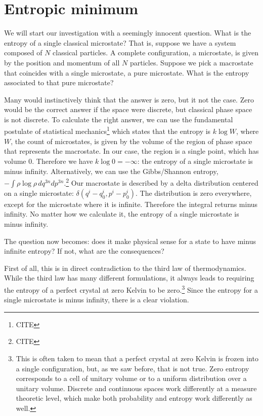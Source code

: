 \documentclass[10pt,twocolumn, nofootinbib]{revtex4-2}
\begin{document}
\section{Entropic minimum}

We will start our investigation with a seemingly innocent question. What is the entropy of a single classical microstate? That is, suppose we have a system composed of $N$ classical particles. A complete configuration, a microstate, is given by the position and momentum of all $N$ particles. Suppose we pick a macrostate that coincides with a single microstate, a pure microstate. What is the entropy associated to that pure microstate?

Many would instinctively think that the answer is zero, but it not the case. Zero would be the correct answer if the space were discrete, but classical phase space is not discrete. To calculate the right answer, we can use the fundamental postulate of statistical mechanics\footnote{CITE} which states that the entropy is $k \log W$, where $W$, the count of microstates, is given by the volume of the region of phase space that represents the macrostate. In our case, the region is a single point, which has volume $0$. Therefore we have $k \log 0 = -\infty$: the entropy of a single microstate is minus infinity. Alternatively, we can use the Gibbs/Shannon entropy, $ -\int \rho \log \rho \, dq^{3n} dp^{3n}$.\footnote{CITE} Our macrostate is described by a delta distribution centered on a single microstate: $\delta(q^i-q^i_0, p^i-p^i_0)$. The distribution is zero everywhere, except for the microstate where it is infinite. Therefore the integral returns minus infinity. No matter how we calculate it, the entropy of a single microstate is minus infinity. 

The question now becomes: does it make physical sense for a state to have minus infinite entropy? If not, what are the consequences?

First of all, this is in direct contradiction to the third law of thermodynamics. While the third law has many different formulations, it always leads to requiring the entropy of a perfect crystal at zero Kelvin to be zero.\footnote{This is often taken to mean that a perfect crystal at zero Kelvin is frozen into a single configuration, but, as we saw before, that is not true. Zero entropy corresponds to a cell of unitary volume or to a uniform distribution over a unitary volume. Discrete and continuous spaces work differently at a measure theoretic level, which make both probability and entropy work differently as well.} Since the entropy for a single microstate is minus infinity, there is a clear violation.
\end{document}

